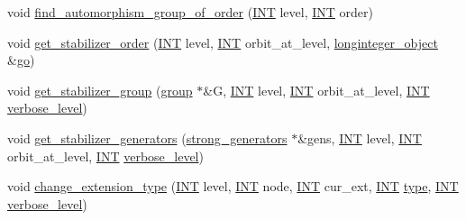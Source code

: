 \begin{DoxyCompactItemize}
\item 
void \mbox{\hyperlink{classgenerator_a0e1112dc17485a838afe04b4d011a0df}{find\+\_\+automorphism\+\_\+group\+\_\+of\+\_\+order}} (\mbox{\hyperlink{galois_8h_a09fddde158a3a20bd2dcadb609de11dc}{I\+NT}} level, \mbox{\hyperlink{galois_8h_a09fddde158a3a20bd2dcadb609de11dc}{I\+NT}} order)
\item 
void \mbox{\hyperlink{classgenerator_a2a03fc974c76e47e999f3abc99e6b81d}{get\+\_\+stabilizer\+\_\+order}} (\mbox{\hyperlink{galois_8h_a09fddde158a3a20bd2dcadb609de11dc}{I\+NT}} level, \mbox{\hyperlink{galois_8h_a09fddde158a3a20bd2dcadb609de11dc}{I\+NT}} orbit\+\_\+at\+\_\+level, \mbox{\hyperlink{classlonginteger__object}{longinteger\+\_\+object}} \&\mbox{\hyperlink{classgenerator_a52320c8f288e892987d7af3b89dad4a0}{go}})
\item 
void \mbox{\hyperlink{classgenerator_a1a1ffde2c62084e556850b8142a9152c}{get\+\_\+stabilizer\+\_\+group}} (\mbox{\hyperlink{classgroup}{group}} $\ast$\&G, \mbox{\hyperlink{galois_8h_a09fddde158a3a20bd2dcadb609de11dc}{I\+NT}} level, \mbox{\hyperlink{galois_8h_a09fddde158a3a20bd2dcadb609de11dc}{I\+NT}} orbit\+\_\+at\+\_\+level, \mbox{\hyperlink{galois_8h_a09fddde158a3a20bd2dcadb609de11dc}{I\+NT}} \mbox{\hyperlink{classgenerator_a7fedc6488314cbc00dbfcc42d311e1ce}{verbose\+\_\+level}})
\item 
void \mbox{\hyperlink{classgenerator_a744da633f741e1aa27701fe9d203d564}{get\+\_\+stabilizer\+\_\+generators}} (\mbox{\hyperlink{classstrong__generators}{strong\+\_\+generators}} $\ast$\&gens, \mbox{\hyperlink{galois_8h_a09fddde158a3a20bd2dcadb609de11dc}{I\+NT}} level, \mbox{\hyperlink{galois_8h_a09fddde158a3a20bd2dcadb609de11dc}{I\+NT}} orbit\+\_\+at\+\_\+level, \mbox{\hyperlink{galois_8h_a09fddde158a3a20bd2dcadb609de11dc}{I\+NT}} \mbox{\hyperlink{classgenerator_a7fedc6488314cbc00dbfcc42d311e1ce}{verbose\+\_\+level}})
\item 
void \mbox{\hyperlink{classgenerator_a8701aa1c97fa3c67a483ec2cfaf45476}{change\+\_\+extension\+\_\+type}} (\mbox{\hyperlink{galois_8h_a09fddde158a3a20bd2dcadb609de11dc}{I\+NT}} level, \mbox{\hyperlink{galois_8h_a09fddde158a3a20bd2dcadb609de11dc}{I\+NT}} node, \mbox{\hyperlink{galois_8h_a09fddde158a3a20bd2dcadb609de11dc}{I\+NT}} cur\+\_\+ext, \mbox{\hyperlink{galois_8h_a09fddde158a3a20bd2dcadb609de11dc}{I\+NT}} \mbox{\hyperlink{_l_i_b_2_g_a_l_o_i_s_2dlx_8_c_ad241c8005abf9f323e9fffec67f55abf}{type}}, \mbox{\hyperlink{galois_8h_a09fddde158a3a20bd2dcadb609de11dc}{I\+NT}} \mbox{\hyperlink{classgenerator_a7fedc6488314cbc00dbfcc42d311e1ce}{verbose\+\_\+level}})

\end{DoxyCompactItemize}

